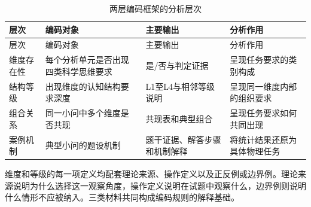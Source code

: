 \documentclass[
  12pt,
  a4paper]{ctexbook}
\begin{document}
\begin{longtable}[]{@{}
  >{\raggedright\arraybackslash}p{}
  >{\raggedright\arraybackslash}p{}
  >{\raggedright\arraybackslash}p{}
  >{\raggedright\arraybackslash}p{}@{}}
\caption{两层编码框架的分析层次}\tabularnewline
\toprule\noalign{}
\rowcolor{ThesisPale}
\begin{minipage}[b]{\linewidth}\raggedright
层次
\end{minipage} & \begin{minipage}[b]{\linewidth}\raggedright
编码对象
\end{minipage} & \begin{minipage}[b]{\linewidth}\raggedright
主要输出
\end{minipage} & \begin{minipage}[b]{\linewidth}\raggedright
分析作用
\end{minipage} \\
\midrule\noalign{}
\endfirsthead
\toprule\noalign{}
\rowcolor{ThesisPale}
\begin{minipage}[b]{\linewidth}\raggedright
层次
\end{minipage} & \begin{minipage}[b]{\linewidth}\raggedright
编码对象
\end{minipage} & \begin{minipage}[b]{\linewidth}\raggedright
主要输出
\end{minipage} & \begin{minipage}[b]{\linewidth}\raggedright
分析作用
\end{minipage} \\
\midrule\noalign{}
\endhead
\bottomrule\noalign{}
\endlastfoot
维度存在性 & 每个分析单元是否出现四类科学思维要求 & 是/否与判定证据 &
呈现任务要求的类别构成 \\
结构等级 & 出现维度的认知结构要求深度 & L1至L4与相邻等级说明 &
呈现同一维度内部的组织要求 \\
组合关系 & 同一小问中多个维度是否共现 & 共现表和典型组合 &
呈现任务要求如何共同出现 \\
案例机制 & 典型小问的题设机制 & 题干证据、解答步骤和机制解释 &
将统计结果还原为具体物理任务 \\
\end{longtable}

维度和等级的每一项定义均配套理论来源、操作定义以及正反例或边界例。理论来源说明为什么选择这一观察角度，操作定义说明在试题中观察什么，边界例则说明什么情形不应被纳入。三类材料共同构成编码规则的解释基础。
\end{document}
